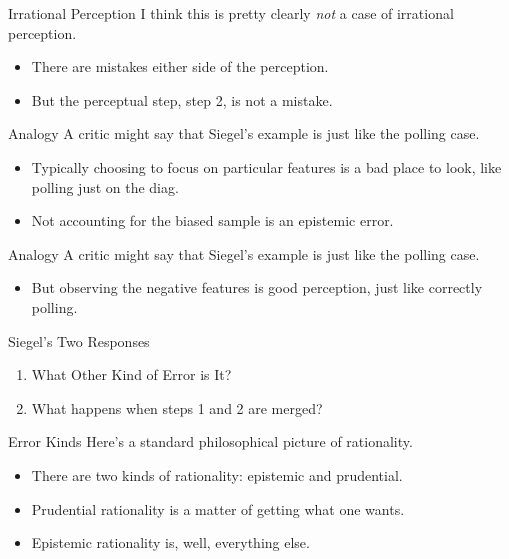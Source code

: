 \documentclass[
  17pt,
  letterpaper,
  ignorenonframetext,
  aspectratio=169,
  xcolor={dvipsnames}]{beamer}
\providecommand{\tightlist}{%
  \setlength{\itemsep}{0pt}\setlength{\parskip}{0pt}}\usepackage{longtable,booktabs,array}
\begin{document}
\begin{frame}{Irrational Perception}
\protect\hypertarget{irrational-perception}{}
I think this is pretty clearly \emph{not} a case of irrational
perception.

\begin{itemize}[<+->]
\tightlist
\item
  There are mistakes either side of the perception.
\item
  But the perceptual step, step 2, is not a mistake.
\end{itemize}
\end{frame}

\begin{frame}{Analogy}
\protect\hypertarget{analogy}{}
A critic might say that Siegel's example is just like the polling case.

\begin{itemize}[<+->]
\tightlist
\item
  Typically choosing to focus on particular features is a bad place to
  look, like polling just on the diag.
\item
  Not accounting for the biased sample is an epistemic error.
\end{itemize}
\end{frame}

\begin{frame}{Analogy}
\protect\hypertarget{analogy-1}{}
A critic might say that Siegel's example is just like the polling case.

\begin{itemize}[<+->]
\tightlist
\item
  But observing the negative features is good perception, just like
  correctly polling.
\end{itemize}
\end{frame}

\begin{frame}{Siegel's Two Responses}
\protect\hypertarget{siegels-two-responses}{}
\begin{enumerate}[<+->]
\tightlist
\item
  What Other Kind of Error is It?
\item
  What happens when steps 1 and 2 are merged?
\end{enumerate}
\end{frame}

\begin{frame}{Error Kinds}
\protect\hypertarget{error-kinds}{}
Here's a standard philosophical picture of rationality.

\begin{itemize}[<+->]
\tightlist
\item
  There are two kinds of rationality: epistemic and prudential.
\item
  Prudential rationality is a matter of getting what one wants.
\item
  Epistemic rationality is, well, everything else.
\end{itemize}
\end{frame}
\end{document}
